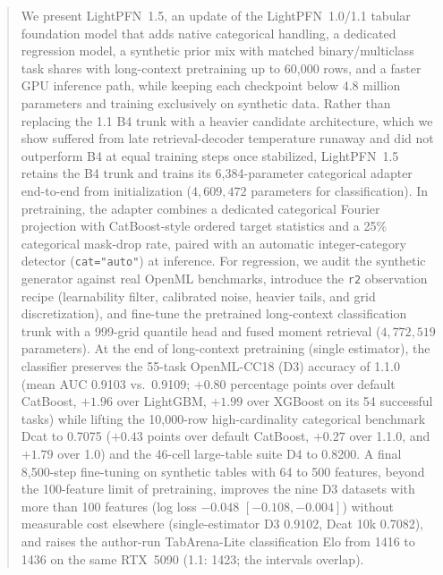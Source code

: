\documentclass[11pt]{article}
\begin{document}
\begin{abstract}
We present LightPFN~1.5, an update of the LightPFN~1.0/1.1 tabular foundation model \cite{ottoboni2026lightpfn} that adds native categorical handling, a dedicated regression model, a synthetic prior mix with matched binary/multiclass task shares with long-context pretraining up to 60,000 rows, and a faster GPU inference path, while keeping each checkpoint below 4.8 million parameters and training exclusively on synthetic data.
Rather than replacing the 1.1 B4 trunk with a heavier candidate architecture, which we show suffered from late retrieval-decoder temperature runaway and did not outperform B4 at equal training steps once stabilized, LightPFN~1.5 retains the B4 trunk and trains its 6,384-parameter categorical adapter end-to-end from initialization ($4{,}609{,}472$ parameters for classification). %
In pretraining, the adapter combines a dedicated categorical Fourier projection with CatBoost-style ordered target statistics and a 25\% categorical mask-drop rate, paired with an automatic integer-category detector (\texttt{cat="auto"}) at inference. %
For regression, we audit the synthetic generator against real OpenML benchmarks, introduce the \texttt{r2} observation recipe (learnability filter, calibrated noise, heavier tails, and grid discretization), and fine-tune the pretrained long-context classification trunk with a 999-grid quantile head and fused moment retrieval ($4{,}772{,}519$ parameters). %
At the end of long-context pretraining (single estimator), the classifier preserves the 55-task OpenML-CC18 (D3) accuracy of 1.1.0 (mean AUC 0.9103 vs.\ 0.9109; $+0.80$ percentage points over default CatBoost, $+1.96$ over LightGBM, $+1.99$ over XGBoost on its 54 successful tasks) while lifting the 10,000-row high-cardinality categorical benchmark Dcat to 0.7075 ($+0.43$ points over default CatBoost, $+0.27$ over 1.1.0, and $+1.79$ over 1.0) and the 46-cell large-table suite D4 to 0.8200. %
A final 8,500-step fine-tuning on synthetic tables with 64 to 500 features, beyond the 100-feature limit of pretraining, improves the nine D3 datasets with more than 100 features (log loss $-0.048$ $[-0.108,-0.004]$) without measurable cost elsewhere (single-estimator D3 0.9102, Dcat 10k 0.7082), and raises the author-run TabArena-Lite classification Elo from 1416 to 1436 on the same RTX~5090 (1.1: 1423; the intervals overlap). %

\end{abstract}
\end{document}

